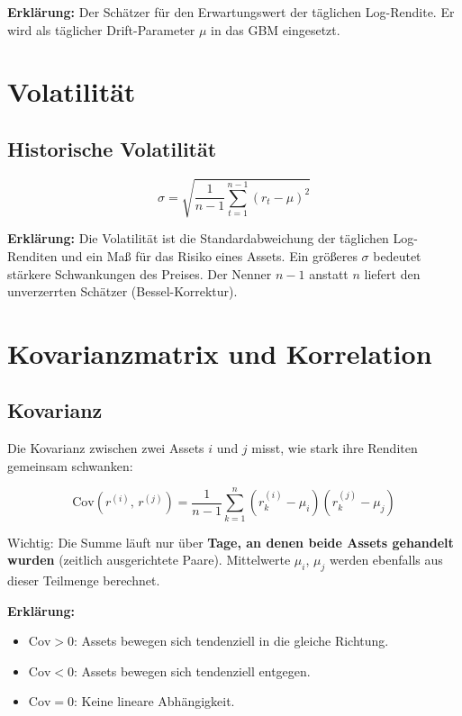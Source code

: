 \documentclass[12pt, a4paper]{article}
\begin{document}
\textbf{Erklärung:} Der Schätzer für den Erwartungswert der täglichen Log-Rendite.
Er wird als täglicher Drift-Parameter $\mu$ in das GBM eingesetzt.

\section{Volatilität}

\subsection{Historische Volatilität}

\begin{equation}
    \sigma = \sqrt{\frac{1}{n-1} \sum_{t=1}^{n-1} \left(r_t - \mu\right)^2}
\end{equation}

\textbf{Erklärung:} Die Volatilität ist die Standardabweichung der täglichen
Log-Renditen und ein Maß für das Risiko eines Assets. Ein größeres $\sigma$
bedeutet stärkere Schwankungen des Preises. Der Nenner $n-1$ anstatt $n$
liefert den unverzerrten Schätzer (Bessel-Korrektur).

\section{Kovarianzmatrix und Korrelation}

\subsection{Kovarianz}

Die Kovarianz zwischen zwei Assets $i$ und $j$ misst, wie stark ihre Renditen
gemeinsam schwanken:

\begin{equation}
    \text{Cov}(r^{(i)},\, r^{(j)}) = \frac{1}{n-1} \sum_{k=1}^{n}
    \left(r^{(i)}_k - \mu_i\right)\!\left(r^{(j)}_k - \mu_j\right)
\end{equation}

Wichtig: Die Summe läuft nur über \textbf{Tage, an denen beide Assets gehandelt
wurden} (zeitlich ausgerichtete Paare). Mittelwerte $\mu_i$, $\mu_j$ werden
ebenfalls aus dieser Teilmenge berechnet.

\textbf{Erklärung:}
\begin{itemize}[leftmargin=1.5em]
    \item $\text{Cov} > 0$: Assets bewegen sich tendenziell in die gleiche Richtung.
    \item $\text{Cov} < 0$: Assets bewegen sich tendenziell entgegen.
    \item $\text{Cov} = 0$: Keine lineare Abhängigkeit.
\end{itemize}
\end{document}
